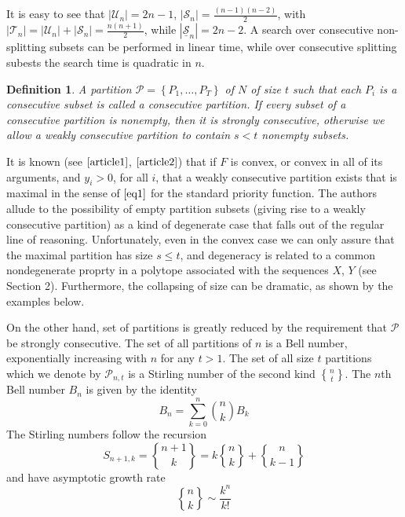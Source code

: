 \documentclass{article}
\newtheorem{definition}{Definition}
\theoremstyle{case}
\newcommand{\stirlingii}{\genfrac{\{}{\}}{0pt}{}}
\begin{document}

It is easy to see that $| \mathcal{U}_n | = 2n - 1$, $| \mathcal{S}_n | = \frac{(n-1)(n-2)}{2}$, with $| \mathcal{T}_n | = | \mathcal{U}_n | + | \mathcal{S}_n | = \frac{n(n+1)}{2}$, while $| \underline{\mathcal{S}}_n | = 2n - 2$. A search over consecutive non-splitting subsets can be performed in linear time, while over consecutive splitting subests the search time is quadratic in $n$.

\begin{definition}
A partition $\mathcal{P} = \left\lbrace P_1, \dots, P_T\right\rbrace$ of $N$ of size $t$ such that each $P_i$ is a consecutive subset is called a consecutive partition. If every subset of a consecutive partition is nonempty, then it is strongly consecutive, otherwise we allow a weakly consecutive partition to contain $s < t$ nonempty subsets.
\end{definition}

It is known (see $\cite{article1}$, $\cite{article2}$) that if $F$ is convex, or convex in all of its arguments, and $y_i > 0$, for all $i$, that a weakly consecutive partition exists that is maximal in the sense of $\ref{eq1}$ for the standard priority function. The authors allude to the possibility of empty partition subsets (giving rise to a weakly consecutive partition) as a kind of degenerate case that falls out of the regular line of reasoning. Unfortunately, even in the convex case we can only assure that the maximal partition has size $s \leq t$, and degeneracy is related to a common nondegenerate proprty in a polytope associated with the sequences $X$, $Y$ (see Section 2). 
Furthermore, the collapsing of size can be dramatic, as shown by the examples below.

On the other hand, set of partitions is greatly reduced by the requirement that $\mathcal{P}$ be strongly consecutive. The set of all partitions of $n$ is a Bell number, exponentially increasing with $n$ for any $t > 1$. The set of all size $t$ partitions which we denote by $\mathcal{P}_{n,t}$ is a Stirling number of the second kind $\stirlingii{n}{t}$. The $n$th Bell number $B_n$ is given by the identity
\[B_n = \sum_{k=0}^{n} \binom{n}{k} B_k\]
The Stirling numbers follow the recursion
\[S_{n+1,k} = \stirlingii{n+1}{k} = k\stirlingii{n}{k} + \stirlingii{n}{k-1}\]
and have asymptotic growth rate 
\[\stirlingii{n}{k} \sim \frac{k^n}{k!}\]
\end{document}
